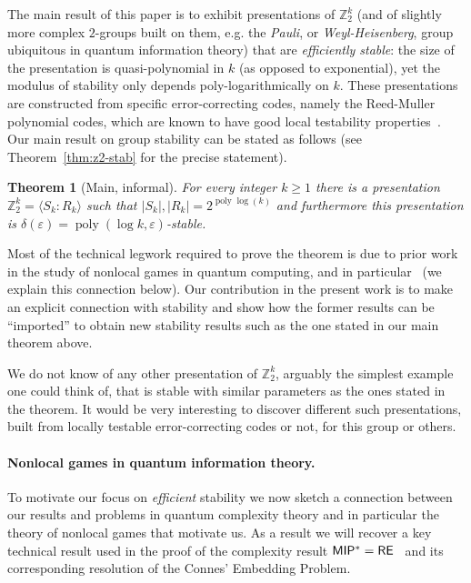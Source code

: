 \documentclass[11pt]{article}
\newtheorem{theorem*}{Theorem}
\theoremstyle{definition}
\newcommand{\Z}{\ensuremath{\mathbb{Z}}}
\DeclareMathOperator{\poly}{poly}
\newcommand{\eps}{\varepsilon}
\begin{document}
The main result of this paper is to exhibit presentations of $\Z_2^k$ (and of slightly more complex $2$-groups built on them, e.g. the \emph{Pauli}, or \emph{Weyl-Heisenberg}, group ubiquitous in quantum information theory) that are \emph{efficiently stable}: the size of the presentation is quasi-polynomial in $k$ (as opposed to exponential), yet the modulus of stability only depends poly-logarithmically on $k$. These presentations are constructed from specific error-correcting codes, namely the Reed-Muller polynomial codes, which are known to have good local testability properties~\cite{babai1991non}. Our main result on group stability can be stated as follows (see Theorem~\ref{thm:z2-stab} for the precise statement).

\begin{theorem*}[Main, informal]
For every integer $k\geq 1$ there is a presentation $\Z_2^k = \langle S_k:R_k\rangle$ such that $|S_k|,|R_k| = 2^{\poly\log(k)}$ and furthermore this presentation is $\delta(\eps)=\poly(\log k,\eps)$-stable. 
\end{theorem*}

Most of the technical legwork required to prove the theorem is due to prior work in the study of nonlocal games in quantum computing, and in particular~\cite{ji2020quantum} (we explain this connection below). Our contribution in the present work is to make an explicit connection with stability and show how the former results can be ``imported'' to obtain new stability results such as the one stated in our main theorem above. 

We do not know of any other presentation of $\Z_2^k$, arguably the simplest example one could think of, that is stable with similar parameters as the ones stated in the theorem. It would be very interesting to discover different such presentations, built from locally testable error-correcting codes or not, for this group or others. 

\paragraph{Nonlocal games in quantum information theory.}
To motivate our focus on \emph{efficient} stability we now sketch a connection between our results and problems in quantum complexity theory and in particular the theory of nonlocal games that motivate us. As a result we will recover a key technical result used in the proof of the complexity result $\sf MIP^* = \sf RE$~\cite{ji2020mip} and its corresponding resolution of the Connes' Embedding Problem.
\end{document}
